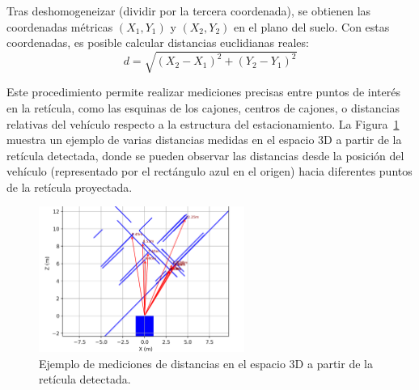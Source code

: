 Tras deshomogeneizar (dividir por la tercera coordenada), se obtienen las coordenadas 
métricas $(X_1, Y_1)$ y $(X_2, Y_2)$ en el plano del suelo. Con estas coordenadas, 
es posible calcular distancias euclidianas reales:
\begin{equation}
d = \sqrt{(X_2 - X_1)^2 + (Y_2 - Y_1)^2}
\end{equation}

Este procedimiento permite realizar mediciones precisas entre puntos de interés en la retícula, 
como las esquinas de los cajones, centros de cajones, o distancias relativas del vehículo 
respecto a la estructura del estacionamiento. La Figura~\ref{fig:distances-grid} muestra 
un ejemplo de varias distancias medidas en el espacio 3D a partir de la retícula detectada, 
donde se pueden observar las distancias desde la posición del vehículo (representado por 
el rectángulo azul en el origen) hacia diferentes puntos de la retícula proyectada.

\begin{figure}[!ht]
    \centering
    \includegraphics[width=0.6\textwidth]{img/3-metodo/distances.png}
    \caption{Ejemplo de mediciones de distancias en el espacio 3D a partir de la retícula detectada.}
    \label{fig:distances-grid}
\end{figure}
